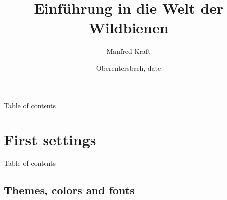 \documentclass[aspectratio=169]{beamer}
\begin{document}

\author[Manfred]{Manfred Kraft}
\title[Wildbienen]{Einführung in die Welt der Wildbienen}
\date{Oberentersbach, date}
\frame{\titlepage}


\begin{frame}{Table of contents}
\tableofcontents
\end{frame}


\section{First settings}

\begin{frame}{Table of contents}
\end{frame}


\subsection[Themes]{Themes, colors and fonts}
\end{document}
